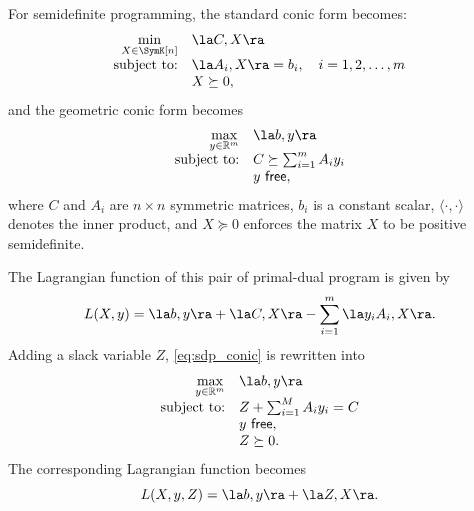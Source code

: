 \documentclass[11pt,twoside,a4paper,openright]{uclouvain-thesis}
\begin{document}
For semidefinite programming, the standard conic form becomes:
\begin{equation}
  \label{eq:sdp_standard}
    \begin{array}{rl}
        \min\limits_{X \in \SymK[n]} & \la C, X \ra\\
        \text{subject to:} & \la A_i, X \ra = b_i, \quad i=1,2,\ldots,m\\
                           & X \succeq 0,
    \end{array}
\end{equation}
and the geometric conic form becomes
\begin{equation}
  \label{eq:sdp_conic}
    \begin{array}{rl}
        \max\limits_{y \in \mathbb{R}^m} & \la b, y \ra\\
        \text{subject to:} & C \succeq \sum_{i=1}^m A_i y_i\\
                           & y\ \mathsf{free},
    \end{array}
\end{equation}
where $C$ and $A_i$ are $n\times n$ symmetric matrices, $b_i$ is a constant scalar, $\langle \cdot, \cdot\rangle$ denotes the inner product, and $X \succeq 0$ enforces the matrix $X$ to be positive semidefinite.

The Lagrangian function of this pair of primal-dual program is given by
\begin{equation}
  \label{eq:LagrangianXy}
  L(X, y) = \la b, y \ra + \la C, X \ra - \sum_{i=1}^m \la y_i A_i, X \ra.
\end{equation}
Adding a slack variable $Z$, \eqref{eq:sdp_conic} is rewritten into
\begin{equation}
  \label{eq:sdp_conic_Z}
    \begin{array}{rl}
        \max\limits_{y \in \mathbb{R}^m} & \la b, y \ra\\
        \text{subject to:} & Z + \sum_{i=1}^M A_i y_i = C\\
                           & y\ \mathsf{free},\\
                           & Z \succeq 0.
    \end{array}
\end{equation}
The corresponding Lagrangian function becomes
\begin{equation}
  \label{eq:LagrangianXyZ}
  L(X, y, Z) = \la b, y \ra + \la Z, X \ra.
\end{equation}
\end{document}
